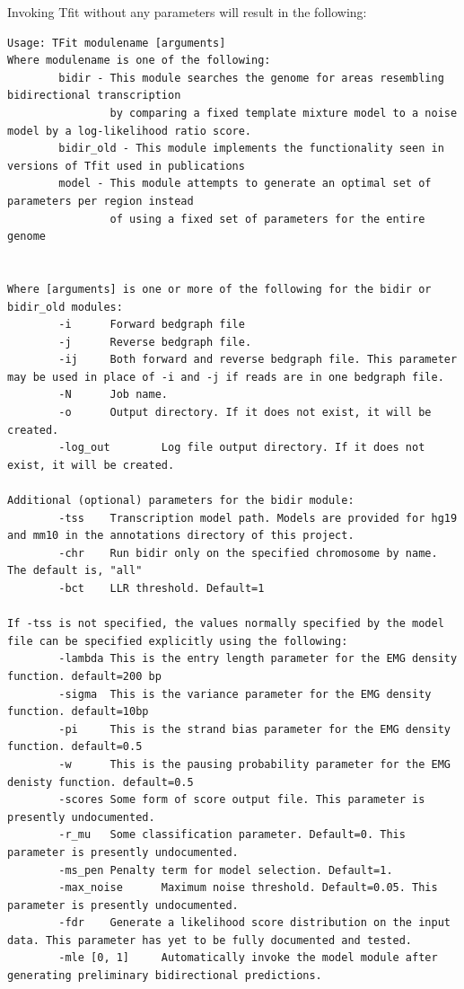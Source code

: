 \documentclass[12pt,letterpaper]{article}
\begin{document}
Invoking Tfit without any parameters will result in the following:
\begin{lstlisting}
Usage: TFit modulename [arguments]
Where modulename is one of the following:
        bidir - This module searches the genome for areas resembling bidirectional transcription
                by comparing a fixed template mixture model to a noise model by a log-likelihood ratio score.
        bidir_old - This module implements the functionality seen in versions of Tfit used in publications
        model - This module attempts to generate an optimal set of parameters per region instead 
                of using a fixed set of parameters for the entire genome


Where [arguments] is one or more of the following for the bidir or bidir_old modules:
        -i      Forward bedgraph file
        -j      Reverse bedgraph file.
        -ij     Both forward and reverse bedgraph file. This parameter may be used in place of -i and -j if reads are in one bedgraph file.
        -N      Job name.
        -o      Output directory. If it does not exist, it will be created.
        -log_out        Log file output directory. If it does not exist, it will be created.

Additional (optional) parameters for the bidir module:
        -tss    Transcription model path. Models are provided for hg19 and mm10 in the annotations directory of this project.
        -chr    Run bidir only on the specified chromosome by name. The default is, "all"
        -bct    LLR threshold. Default=1

If -tss is not specified, the values normally specified by the model file can be specified explicitly using the following:
        -lambda This is the entry length parameter for the EMG density function. default=200 bp
        -sigma  This is the variance parameter for the EMG density function. default=10bp
        -pi     This is the strand bias parameter for the EMG density function. default=0.5
        -w      This is the pausing probability parameter for the EMG denisty function. default=0.5
        -scores Some form of score output file. This parameter is presently undocumented.
        -r_mu   Some classification parameter. Default=0. This parameter is presently undocumented.
        -ms_pen Penalty term for model selection. Default=1.
        -max_noise      Maximum noise threshold. Default=0.05. This parameter is presently undocumented.
        -fdr    Generate a likelihood score distribution on the input data. This parameter has yet to be fully documented and tested.
        -mle [0, 1]     Automatically invoke the model module after generating preliminary bidirectional predictions.



\end{lstlisting}
\end{document}
